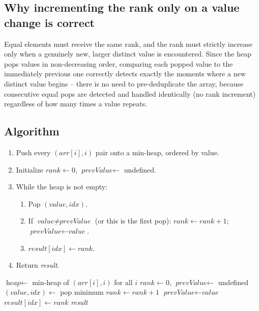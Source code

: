 \subsection*{Why incrementing the rank only on a value change is correct}

Equal elements must receive the same rank, and the rank must strictly
increase only when a genuinely new, larger distinct value is encountered.
Since the heap pops values in non-decreasing order, comparing each popped
value to the immediately previous one correctly detects exactly the
moments where a new distinct value begins -- there is no need to
pre-deduplicate the array, because consecutive equal pops are detected and
handled identically (no rank increment) regardless of how many times a
value repeats.

\subsection*{Algorithm}

\begin{enumerate}
  \item Push every $(\textit{arr}[i], i)$ pair onto a min-heap, ordered
        by value.
  \item Initialize $\textit{rank} \gets 0$, $\textit{prevValue} \gets$
        undefined.
  \item While the heap is not empty:
  \begin{enumerate}
    \item Pop $(\textit{value}, \textit{idx})$.
    \item If $\textit{value} \ne \textit{prevValue}$ (or this is the
          first pop): $\textit{rank} \gets \textit{rank}+1$;
          $\textit{prevValue} \gets \textit{value}$.
    \item $\textit{result}[\textit{idx}] \gets \textit{rank}$.
  \end{enumerate}
  \item Return \textit{result}.
\end{enumerate}

\begin{algorithm}[H]
\caption{Replace Elements by Rank}
\begin{algorithmic}[1]
  \State $\textit{heap} \gets$ min-heap of $(\textit{arr}[i], i)$ for all $i$
  \State $\textit{rank} \gets 0$, $\textit{prevValue} \gets$ undefined
    \State $(\textit{value}, \textit{idx}) \gets$ pop minimum
      \State $\textit{rank} \gets \textit{rank} + 1$
      \State $\textit{prevValue} \gets \textit{value}$
    \EndIf
    \State $\textit{result}[\textit{idx}] \gets \textit{rank}$
  \EndWhile
  \State \Return \textit{result}
\EndProcedure
\end{algorithmic}
\end{algorithm}

